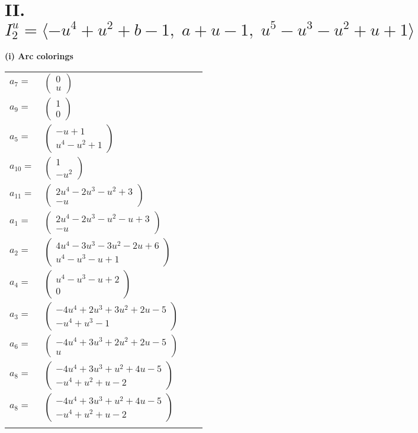 \documentclass[1p]{elsarticle_modified}
\theoremstyle{definition}
\begin{document}
\centering \section*{II. $I^u_{2}= \langle - u^4+u^2+b-1,\;a+u-1,\;u^5- u^3- u^2+u+1 \rangle$}
\flushleft \textbf{(i) Arc colorings}\\
\begin{tabular}{m{7pt} m{180pt} m{7pt} m{180pt} }
\flushright $a_{7}=$&$\begin{pmatrix}0\\u\end{pmatrix}$ \\
\flushright $a_{9}=$&$\begin{pmatrix}1\\0\end{pmatrix}$ \\
\flushright $a_{5}=$&$\begin{pmatrix}- u+1\\u^4- u^2+1\end{pmatrix}$ \\
\flushright $a_{10}=$&$\begin{pmatrix}1\\- u^2\end{pmatrix}$ \\
\flushright $a_{11}=$&$\begin{pmatrix}2 u^4-2 u^3- u^2+3\\- u\end{pmatrix}$ \\
\flushright $a_{1}=$&$\begin{pmatrix}2 u^4-2 u^3- u^2- u+3\\- u\end{pmatrix}$ \\
\flushright $a_{2}=$&$\begin{pmatrix}4 u^4-3 u^3-3 u^2-2 u+6\\u^4- u^3- u+1\end{pmatrix}$ \\
\flushright $a_{4}=$&$\begin{pmatrix}u^4- u^3- u+2\\0\end{pmatrix}$ \\
\flushright $a_{3}=$&$\begin{pmatrix}-4 u^4+2 u^3+3 u^2+2 u-5\\- u^4+u^3-1\end{pmatrix}$ \\
\flushright $a_{6}=$&$\begin{pmatrix}-4 u^4+3 u^3+2 u^2+2 u-5\\u\end{pmatrix}$ \\
\flushright $a_{8}=$&$\begin{pmatrix}-4 u^4+3 u^3+u^2+4 u-5\\- u^4+u^2+u-2\end{pmatrix}$\\ \flushright $a_{8}=$&$\begin{pmatrix}-4 u^4+3 u^3+u^2+4 u-5\\- u^4+u^2+u-2\end{pmatrix}$\\&\end{tabular}
\end{document}
